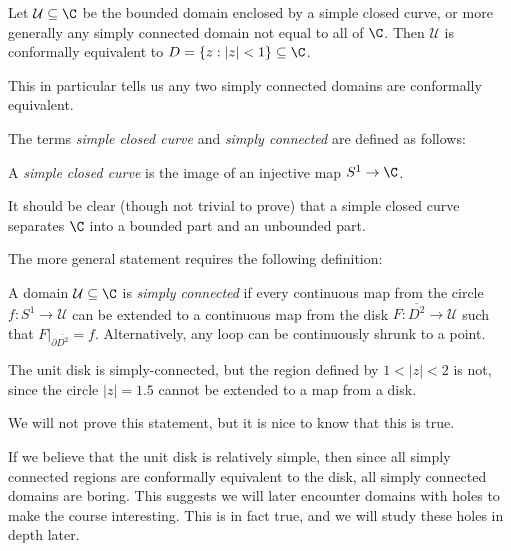 \documentclass[a4paper]{article}
\begin{document}
\begin{thm}
  Let $\mathcal{U} \subseteq \C$ be the bounded domain enclosed by a simple closed curve, or more generally any simply connected domain not equal to all of $\C$. Then $\mathcal{U}$ is conformally equivalent to $D = \{z: |z| < 1\} \subseteq \C$.
\end{thm}
This in particular tells us any two simply connected domains are conformally equivalent.

The terms \emph{simple closed curve} and \emph{simply connected} are defined as follows:

\begin{defi}
  A \emph{simple closed curve} is the image of an injective map $S^1 \to \C$.
\end{defi}
It should be clear (though not trivial to prove) that a simple closed curve separates $\C$ into a bounded part and an unbounded part.

The more general statement requires the following definition:
\begin{defi}
  A domain $\mathcal{U}\subseteq \C$ is \emph{simply connected} if every continuous map from the circle $f: S^1 \to \mathcal{U}$ can be extended to a continuous map from the disk $F: \overline{D^2} \to \mathcal{U}$ such that $F|_{\partial \overline{D^2}} = f$. Alternatively, any loop can be continuously shrunk to a point.
\end{defi}

\begin{eg}
  The unit disk is simply-connected, but the region defined by $1 < |z| < 2$ is not, since the circle $|z| = 1.5$ cannot be extended to a map from a disk.
  \begin{center}
  \end{center}
\end{eg}
We will not prove this statement, but it is nice to know that this is true.

If we believe that the unit disk is relatively simple, then since all simply connected regions are conformally equivalent to the disk, all simply connected domains are boring. This suggests we will later encounter domains with holes to make the course interesting. This is in fact true, and we will study these holes in depth later.
\end{document}
